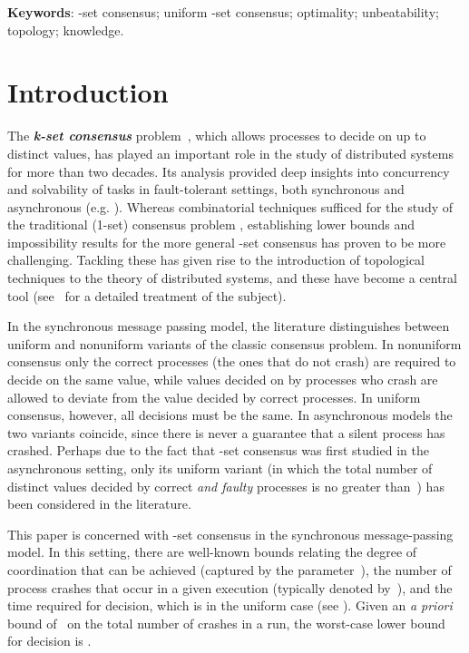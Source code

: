 \documentclass[11pt]{article}
\theoremstyle{definition}
\newcommand{\defemph}[1]{\textbf{\textit{#1}}}
\begin{document}
\noindent
\textbf{Keywords}:
-set consensus; uniform -set consensus; optimality; unbeatability; topology; knowledge.

\section{Introduction}

The \defemph{k-set consensus} problem~\cite{Chaudhuri90}, which allows processes to decide on up to~ distinct values,
has played an important role in the study of distributed systems for more than two decades.
Its analysis provided deep insights into concurrency and solvability of tasks in fault-tolerant settings, both synchronous and asynchronous
(e.g. \cite{AGGT, BorowskyG93,CHLT, GGP,GHP, Herlihy:1999, SaksZ00}).
Whereas combinatorial techniques sufficed for the study of the traditional (1-set) consensus problem \cite{FLP},  establishing lower bounds and impossibility results for the more general
-set consensus has proven to be more challenging. Tackling these has given rise to the introduction of topological techniques to the theory of distributed systems, and these have become a central tool (see~\cite{Herlihy2013} for a detailed treatment of the subject).

In the synchronous message passing model, the literature distinguishes between uniform and  nonuniform variants of the classic consensus problem.  In nonuniform consensus only the correct processes (the ones that do not crash) are required to decide on the same value, while values decided on by processes who crash are allowed to deviate from the
value decided by
correct processes. In uniform consensus, however, all decisions must be the same. In asynchronous models the two variants coincide, since there is never a guarantee that a silent process has crashed.
Perhaps due to the fact that -set consensus was first studied in the asynchronous setting, only its uniform variant (in which the total number of distinct values decided by correct \emph{and faulty} processes is no greater than~) has been considered in the literature.

This paper is concerned with -set consensus in the synchronous message-passing model. In this setting, there are well-known bounds relating the degree of coordination that can be achieved (captured by the parameter~), the number of process crashes that occur
in a given execution (typically denoted by~), and the time required for decision, which is
 in the uniform case (see \cite{AGGT,GGP,GHP}).
Given an {\it a priori} bound of~ on the total number of crashes in a run, the worst-case lower bound for decision is 
\cite{CHLT}.
\end{document}
